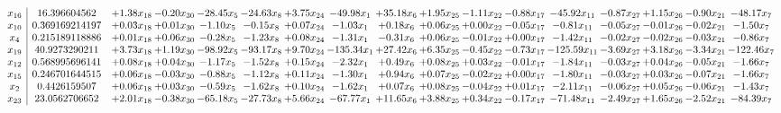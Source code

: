 \documentclass[9pt]{article}
\begin{document}
 \[\begin{array}{c| c c@{\hskip 2pt} c@{\hskip 2pt} c@{\hskip 2pt} c@{\hskip 2pt} c@{\hskip 2pt} c@{\hskip 2pt} c@{\hskip 2pt} c@{\hskip 2pt} c@{\hskip 2pt} c@{\hskip 2pt} c@{\hskip 2pt} c@{\hskip 2pt} c@{\hskip 2pt} c@{\hskip 2pt} c@{\hskip 2pt} }
 x_{16}   &  16.396604562 & +  1.38 x_{18} & -0.20 x_{30} & -28.45 x_{5} & -24.63 x_{8} & +  3.75 x_{24} & -49.98 x_{1} & + 35.18 x_{6} & +  1.95 x_{25} & -1.11 x_{22} & -0.88 x_{17} & -45.92 x_{11} & -0.87 x_{27} & +  1.15 x_{26} & -0.90 x_{21} & -48.17 x_{7}\\
 x_{10}   &  0.369169214197 & +  0.03 x_{18} & +  0.01 x_{30} & -1.10 x_{5} & -0.15 x_{8} & +  0.07 x_{24} & -1.03 x_{1} & +  0.18 x_{6} & +  0.06 x_{25} & +  0.00 x_{22} & -0.05 x_{17} & -0.81 x_{11} & -0.05 x_{27} & -0.01 x_{26} & -0.02 x_{21} & -1.50 x_{7}\\
 x_{4}   &  0.215189118886 & +  0.01 x_{18} & +  0.06 x_{30} & -0.28 x_{5} & -1.23 x_{8} & +  0.08 x_{24} & -1.31 x_{1} & -0.31 x_{6} & +  0.06 x_{25} & -0.01 x_{22} & +  0.00 x_{17} & -1.42 x_{11} & -0.02 x_{27} & -0.02 x_{26} & -0.03 x_{21} & -0.86 x_{7}\\
 x_{19}   &  40.9273290211 & +  3.73 x_{18} & +  1.19 x_{30} & -98.92 x_{5} & -93.17 x_{8} & +  9.70 x_{24} & -135.34 x_{1} & + 27.42 x_{6} & +  6.35 x_{25} & -0.45 x_{22} & -0.73 x_{17} & -125.59 x_{11} & -3.69 x_{27} & +  3.18 x_{26} & -3.34 x_{21} & -122.46 x_{7}\\
 x_{12}   &  0.568995696141 & +  0.08 x_{18} & +  0.04 x_{30} & -1.17 x_{5} & -1.52 x_{8} & +  0.15 x_{24} & -2.32 x_{1} & +  0.49 x_{6} & +  0.08 x_{25} & +  0.03 x_{22} & -0.01 x_{17} & -1.84 x_{11} & -0.03 x_{27} & +  0.04 x_{26} & -0.05 x_{21} & -1.66 x_{7}\\
 x_{15}   &  0.246701644515 & +  0.06 x_{18} & -0.03 x_{30} & -0.88 x_{5} & -1.12 x_{8} & +  0.11 x_{24} & -1.30 x_{1} & +  0.94 x_{6} & +  0.07 x_{25} & -0.02 x_{22} & +  0.00 x_{17} & -1.80 x_{11} & -0.03 x_{27} & +  0.03 x_{26} & -0.07 x_{21} & -1.66 x_{7}\\
 x_{2}   &  0.4426159507 & +  0.06 x_{18} & +  0.03 x_{30} & -0.59 x_{5} & -1.62 x_{8} & +  0.10 x_{24} & -1.62 x_{1} & +  0.07 x_{6} & +  0.08 x_{25} & -0.04 x_{22} & +  0.01 x_{17} & -2.11 x_{11} & -0.06 x_{27} & +  0.05 x_{26} & -0.06 x_{21} & -1.43 x_{7}\\
 x_{23}   &  23.0562706652 & +  2.01 x_{18} & -0.38 x_{30} & -65.18 x_{5} & -27.73 x_{8} & +  5.66 x_{24} & -67.77 x_{1} & + 11.65 x_{6} & +  3.88 x_{25} & +  0.34 x_{22} & -0.17 x_{17} & -71.48 x_{11} & -2.49 x_{27} & +  1.65 x_{26} & -2.52 x_{21} & -84.39 x_{7}\\

\end{array}\]
\end{document}
